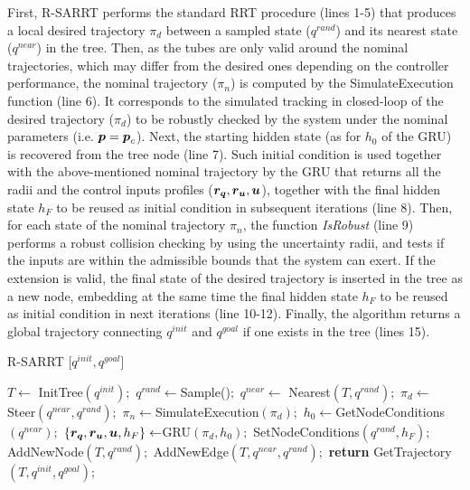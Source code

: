 First, R-SARRT performs the standard RRT procedure (lines 1-5) that produces a local desired trajectory $\pi_d$ between a sampled state (${q}^{rand}$) and its nearest state (${q}^{near}$) in the tree. 
Then, as the tubes are only valid around the nominal trajectories, which may differ from the desired ones depending on the controller performance, the nominal trajectory ($\pi_{n}$) is computed by the SimulateExecution function (line 6).
It corresponds to the simulated tracking in closed-loop of the desired trajectory ($\pi_d$) to be robustly checked by the system under the nominal parameters (i.e. $\boldsymbol{p} = \boldsymbol{p}_c$).
Next, the starting hidden state (as for $h_{0}$ of the GRU) is recovered from the tree node (line 7).
Such initial condition is used together with the above-mentioned nominal trajectory by the GRU that returns all the radii and the control inputs profiles ($\boldsymbol{r_q},\boldsymbol{r_u},\boldsymbol{u}$), together with the final hidden state $h_{F}$ to be reused as initial condition in subsequent iterations (line 8).
Then, for each state of the nominal trajectory $\pi_{n}$, the function \emph{IsRobust} (line 9) performs a robust collision checking by using the uncertainty radii, and tests if the inputs are within the admissible bounds that the system can exert.
If the extension is valid, the final state of the desired trajectory is inserted in the tree as a new node, embedding at the same time the final hidden state $h_{F}$ to be reused as initial condition in next iterations (line 10-12).
Finally, the algorithm returns a global trajectory connecting ${q}^{init}$ and ${q}^{goal}$ if one exists in the tree (lines 15).

\begin{algorithm}[t]
\caption{R-SARRT [$q^{init}, q^{goal}$]}\label{alg:ExtensionExample}
\begin{algorithmic}[1]
\State $T \gets$ InitTree$({q^{init}});$
\State ${q^{rand}} \gets $Sample()$;$
\State ${q^{near}} \gets$ Nearest$(T,{q^{rand}});$
\State $\pi_d \gets$ Steer$({q^{near}},{q^{rand}});$
\State $\pi_{n} \gets $SimulateExecution$(\pi_d);$
\State $h_{0} \gets $GetNodeConditions$({q^{near}});$
\State $\left \{\boldsymbol{r_q},\boldsymbol{r_u},\boldsymbol{u}, h_{F} \right \} \gets $GRU$(\pi_d,h_{0});$
        \State SetNodeConditions$({q^{rand}}, h_{F});$
        \State AddNewNode$(T, {q^{rand}});$
        \State AddNewEdge$(T, {q^{near}}, {q^{rand}});$
\EndIf
\EndWhile
\State \textbf{return} GetTrajectory$(T, q^{init}, q^{goal})$;
\end{algorithmic}
\end{algorithm}


